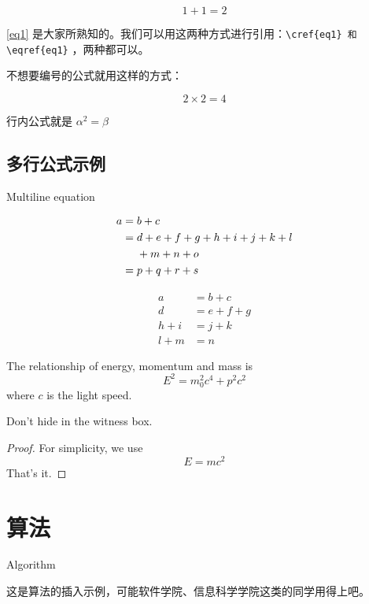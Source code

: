\begin{equation}
1+1=2 \label{eq1}
\end{equation}

\cref{eq1} 是大家所熟知的。我们可以用这两种方式进行引用：\verb|\cref{eq1} 和 \eqref{eq1}| ，两种都可以。

不想要编号的公式就用这样的方式：

 \[ 2\times 2=4 \]

 行内公式就是  $ \alpha ^2= \beta $

\subsection{多行公式示例}{Multiline equation}

\begin{align}
a ={} & b + c \\
={} & d + e + f + g + h + i
+ j + k + l \notag \\
& + m + n + o \\
={} & p + q + r + s
\end{align}

\begin{equation}
\begin{aligned}
a &= b + c \\
d &= e + f + g \\
h + i &= j + k \\
l + m &= n
\end{aligned} \label{eq3}
\end{equation}

\begin{theory}
The relationship of energy,
momentum and mass is
\[E^2 = m_0^2 c^4 + p^2 c^2\]
where $c$ is the light speed.
\end{theory}

\begin{law}\label{law:box}
Don’t hide in the witness box.
\end{law}


\begin{proof}
For simplicity, we use
\[
E=mc^2
\]
That’s it.
\end{proof}


\section{算法}{Algorithm}

这是算法的插入示例，可能软件学院、信息科学学院这类的同学用得上吧。

